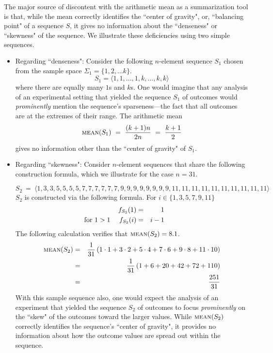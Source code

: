 The major source of discontent with the arithmetic mean as a summarization tool is that, while the mean correctly identifies the ``center of gravity", or, ``balancing point" of a sequence $S$, it gives no information about the ``denseness" or ``skewness" of the sequence.  We illustrate these deficiencies using two simple sequences.
  
\begin{itemize}
\item
Regarding ``denseness":
Consider the following $n$-element sequence $S_1$ chosen from the sample space $\Sigma_1 = \{1, 2, \ldots k\}$.
\[ S_1 = \langle 1, 1, \ldots, 1, k, \ldots, k, k \rangle \]
where there are equally many $1$s and $k$s.  One would imagine that any analysis of an 
experimental setting that yielded the sequence $S_1$ of outcomes would {\em prominently} mention the sequence's sparseness---the fact that all outcomes are at the extremes of their range.  The arithmetic mean
\[  \mbox{\sc mean}(S_1) \ = \ \frac{(k+1)n}{2n} \ = \ {k+1 \over 2} \]
gives no information other than the ``center of gravity" of $S_1$.

\item
Regarding ``skewness":
Consider $n$-element sequences that share the following construction formula, which
we illustrate for the case $n=31$.

{\small
\[ S_2 \ = \ \langle 
1,
3,3,
5,5,5,5,
7,7,7,7,7,7,
9,9,9,9,9,9,9,9,
11,11,11,11,11,11,11,11,11,11
\rangle \]
} 
\hspace*{-.1in} $S_2$ is constructed via the following formula.  For $i \in \{1,3,5,7,9,11\}$
\begin{eqnarray*}
\hspace*{-.35in} f_{S_2}(1)  & = & 1 \\
\hspace*{-.35in} \mbox{ for } 1 > 1 \ \ \ \ f_{S_2}(i)   & = & i-1
\end{eqnarray*}  
The following calculation verifies that $\mbox{\sc mean}(S_2) = 8.1$. 
\begin{eqnarray*}
\mbox{\sc mean}(S_2)
 & = & 
{1 \over 31}
\left(
1 \cdot 1 +
3 \cdot 2 +
5 \cdot 4 +
7 \cdot 6 +
9 \cdot 8 +
11 \cdot 10
\right)
 \\
  & = & 
{1 \over 31}
\left(
 1 + 6 + 20 + 42 + 72 + 110
\right)
 \\
  & = & 
\frac{251}{31}
\end{eqnarray*}
With this sample sequence also, one would expect the analysis of an experiment that yielded the sequence $S_2$ of outcomes to focus {\em prominently} on the ``skew" of the outcomes toward the
larger values.  While $\mbox{\sc mean}(S_2)$ correctly identifies the sequence's ``center of gravity", it provides no information about how the outcome values are spread out within the sequence.
\end{itemize}


